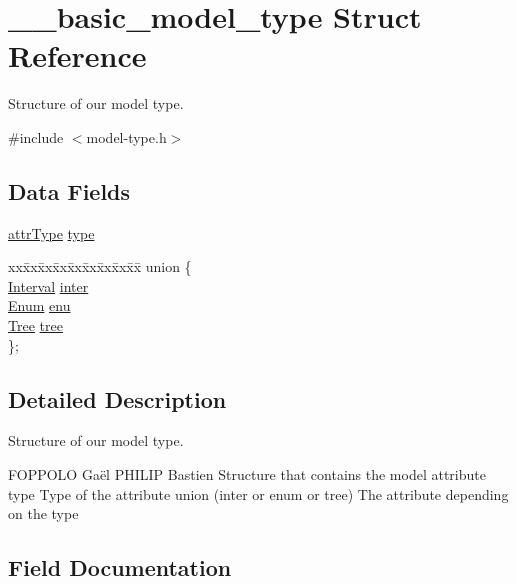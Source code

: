 \hypertarget{struct____basic__model__type}{}\section{\+\_\+\+\_\+basic\+\_\+model\+\_\+type Struct Reference}
\label{struct____basic__model__type}


Structure of our model type.  




{\ttfamily \#include $<$model-\/type.\+h$>$}

\subsection*{Data Fields}
\begin{DoxyCompactItemize}
\item 
\hyperlink{attribute-types_8h_a8ed2f1d0c280dd48cac531e6b26ef8fc}{attr\+Type} \hyperlink{struct____basic__model__type_a83232389e229881b11f9a0465d44f3c6}{type}
\item 
\begin{tabbing}
xx\=xx\=xx\=xx\=xx\=xx\=xx\=xx\=xx\=\kill
union \{\\
\>\hyperlink{interval_8h_a506b375dfe936bbe70e79b44be526738}{Interval} \hyperlink{struct____basic__model__type_ab8d5678611d08643553531e646f4488a}{inter}\\
\>\hyperlink{enum_8h_ae828cfc6972c967f6f2f1574569847c1}{Enum} \hyperlink{struct____basic__model__type_a85c1057180208db35284216b538069aa}{enu}\\
\>\hyperlink{tree_8h_abeafb453c4803982413917045332fc61}{Tree} \hyperlink{struct____basic__model__type_ad5062e379e5e17e5859a60ae73071646}{tree}\\
\}; \\

\end{tabbing}\end{DoxyCompactItemize}


\subsection{Detailed Description}
Structure of our model type. 

F\+O\+P\+P\+O\+LO Gaël  P\+H\+I\+L\+IP Bastien Structure that contains the model attribute  type Type of the attribute  union (inter or enum or tree) The attribute depending on the type 

\subsection{Field Documentation}
